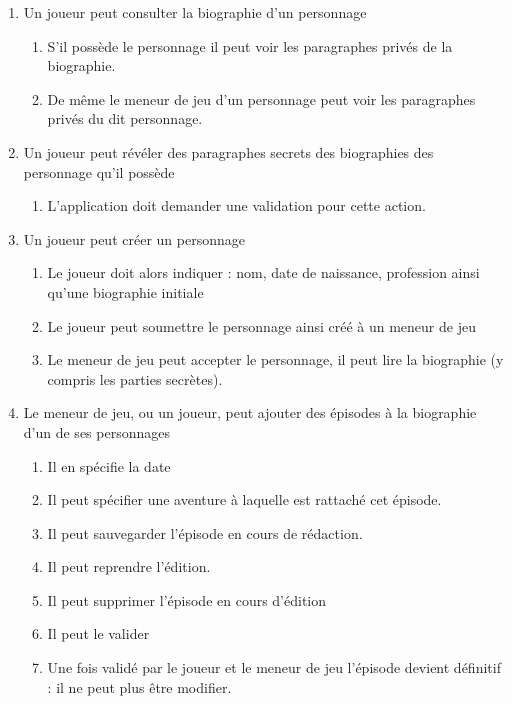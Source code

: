 \documentclass[a4paper, 11pt, titlepage]{article}
\begin{document}
\begin{enumerate}
    \item Un joueur peut consulter la biographie d'un personnage 
        \begin{enumerate}
            \item  S'il possède le personnage il peut voir les paragraphes privés de la biographie.
            \item De même le meneur de jeu d'un personnage peut voir les paragraphes privés du dit personnage.
        \end{enumerate}
    \item Un joueur peut révéler des paragraphes secrets des biographies des personnage qu'il possède 
    \begin{enumerate}
        \item  L'application doit demander une validation pour cette action.            
    \end{enumerate}
      \item Un joueur peut créer un personnage 
      \begin{enumerate}
        \item  Le joueur doit alors indiquer : nom, date de naissance, profession ainsi qu'une biographie initiale
        \item Le joueur peut soumettre le personnage ainsi créé à un meneur de jeu
        \item Le meneur de jeu peut accepter le personnage, il peut lire la biographie (y compris les parties secrètes).
      \end{enumerate}
      \item Le meneur de jeu, ou un joueur, peut ajouter des épisodes à la biographie d'un de ses personnages 
      \begin{enumerate}
        \item Il en spécifie la date
        \item Il peut spécifier une aventure à laquelle est rattaché cet épisode. 
        \item  Il peut sauvegarder l'épisode en cours de rédaction.
        \item Il peut reprendre l'édition.
        \item Il peut supprimer l'épisode en cours d'édition
        \item Il peut le valider
        \item Une fois validé par le joueur et le meneur de jeu l'épisode devient définitif : il ne peut plus être modifier.
      \end{enumerate}

\end{enumerate}
\end{document}
